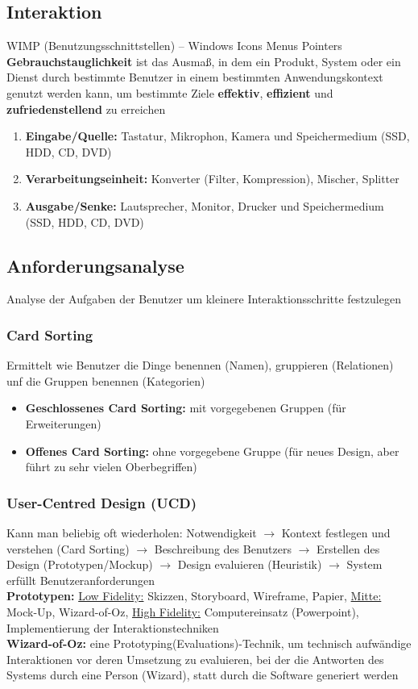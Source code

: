 \documentclass[12pt,landscape]{article}
\begin{document}
\begin{multicols}{3}
\subsection{Interaktion}
WIMP (Benutzungsschnittstellen) -- Windows Icons Menus Pointers\\
\hypertarget{Gebrauchstauglichkeit}{\textbf{Gebrauchstauglichkeit}} ist das Ausmaß, in dem ein Produkt, System oder ein Dienst durch bestimmte Benutzer in einem bestimmten Anwendungskontext genutzt werden kann, um bestimmte Ziele \textbf{effektiv}, \textbf{effizient} und \textbf{zufriedenstellend} zu erreichen\\
\begin{enumerate}
\item \textbf{Eingabe/Quelle:} Tastatur, Mikrophon, Kamera und Speichermedium (SSD, HDD, CD, DVD)
\item \textbf{Verarbeitungseinheit:} Konverter (Filter, Kompression), Mischer, Splitter
\item \textbf{Ausgabe/Senke:} Lautsprecher, Monitor, Drucker und Speichermedium (SSD, HDD, CD, DVD)
\end{enumerate}
\subsection{Anforderungsanalyse}
Analyse der Aufgaben der Benutzer um kleinere Interaktionsschritte festzulegen
\subsubsection{Card Sorting}
Ermittelt wie Benutzer die Dinge benennen (Namen), gruppieren (Relationen) unf die Gruppen benennen (Kategorien)
\begin{itemize}
\item \textbf{Geschlossenes Card Sorting:} mit vorgegebenen Gruppen (für Erweiterungen)
\item \textbf{Offenes Card Sorting:} ohne vorgegebene Gruppe (für neues Design, aber führt zu sehr vielen Oberbegriffen)
\end{itemize}
\subsubsection{User-Centred Design (UCD)}
Kann man beliebig oft wiederholen:
Notwendigkeit $\rightarrow$ Kontext festlegen und verstehen (Card Sorting) $\rightarrow$ Beschreibung des Benutzers $\rightarrow$ Erstellen des Design (Prototypen/Mockup) $\rightarrow$ Design evaluieren (Heuristik) $\rightarrow$ System erfüllt Benutzeranforderungen\\
\textbf{Prototypen:} \underline{Low Fidelity:} Skizzen, Storyboard, Wireframe, Papier, \underline{Mitte:} Mock-Up, Wizard-of-Oz, \underline{High Fidelity:} Computereinsatz (Powerpoint), Implementierung der Interaktionstechniken\\
\textbf{Wizard-of-Oz:} eine Prototyping(Evaluations)-Technik, um technisch aufwändige Interaktionen vor deren Umsetzung zu evaluieren, bei der die Antworten des Systems durch eine Person (Wizard), statt durch die Software generiert werden

\end{multicols}
\end{document}
